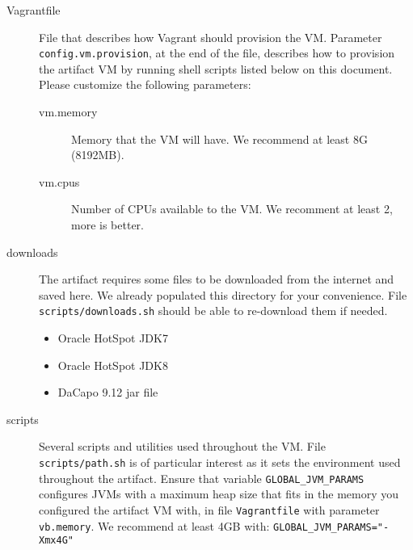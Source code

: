 \documentclass[12pt]{article}
\begin{document}
\begin{description}

    \item[Vagrantfile] File that describes how Vagrant should provision the VM.
        Parameter \texttt{config.vm.provision}, at the end of the file,
        describes how to provision the artifact VM by running shell scripts
        listed below on this document.  Please customize the following
        parameters:

        \begin{description}

            \item[vm.memory] Memory that the VM will have.  We recommend at least 8G (8192MB).

            \item[vm.cpus] Number of CPUs available to the VM.  We recomment at least 2, more is better.

        \end{description}

    \item[downloads] The artifact requires some files to be downloaded from the
        internet and saved here.  We already populated this directory for your
        convenience.  File \texttt{scripts/downloads.sh} should be able to
        re-download them if needed.

        \begin{itemize}

            \item Oracle HotSpot JDK7

            \item Oracle HotSpot JDK8

            \item DaCapo 9.12 jar file

        \end{itemize}

    \item[scripts]  Several scripts and utilities used throughout the VM.  File
        \texttt{scripts/path.sh} is of particular interest as it sets the
        environment used throughout the artifact.  Ensure that variable
        \texttt{GLOBAL\_JVM\_PARAMS} configures JVMs with a maximum heap size
        that fits in the memory you configured the artifact VM with, in file
        \texttt{Vagrantfile} with parameter \texttt{vb.memory}.  We recommend at
        least 4GB with: \texttt{GLOBAL\_JVM\_PARAMS="-Xmx4G"}


\end{description}
\end{document}

